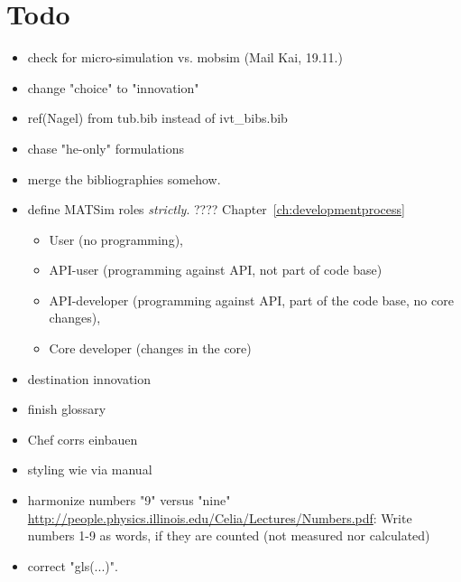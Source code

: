 \vfill\eject

\section*{Todo}

\begin{itemize}

\item check for micro-simulation vs. mobsim (Mail Kai, 19.11.)

\item change "choice" to "innovation"

\item ref(Nagel) from tub.bib instead of ivt\_bibs.bib

\item chase "he-only" formulations

\item merge the bibliographies somehow.

\item define MATSim roles \emph{strictly}. ???? Chapter~\ref{ch:developmentprocess}
\begin{itemize}
\item User (no programming), 
\item API-user (programming against API, not part of code base) 
\item API-developer (programming against API, part of the code base, no core changes), 
\item Core developer (changes in the core)
\end{itemize}

\item destination innovation

\item finish glossary

\item Chef corrs einbauen

\item styling wie via manual

\item harmonize numbers "9" versus "nine" \url{http://people.physics.illinois.edu/Celia/Lectures/Numbers.pdf}: Write numbers 1-9 as words, if they are counted (not measured nor calculated)

\item correct "gls(...)".


\end{itemize}
